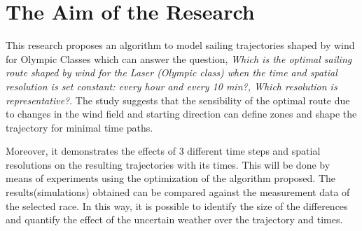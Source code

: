  \section{The Aim of the Research}
This research proposes an algorithm to model sailing trajectories shaped by wind for Olympic Classes which %
can answer the question, \textit{Which is the optimal sailing route shaped by wind for the Laser (Olympic class) when the time and spatial resolution is set constant: every hour and every 10 min?, Which resolution is representative?}. The study suggests that the sensibility of the optimal route due to changes in the wind field and starting direction can define zones and shape the trajectory for minimal time paths. \par 

Moreover, it demonstrates the effects of 3 different time steps and spatial resolutions on the resulting trajectories with its times. This will be done by means of experiments using the optimization of the algorithm proposed. The results(simulations) obtained can be compared against the measurement data of the selected race. In this way, it is possible to identify the size of the differences and quantify the effect of the uncertain weather over the trajectory and times.\par 


